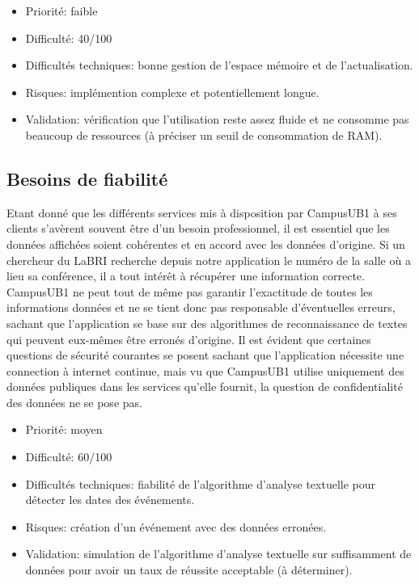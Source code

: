 \documentclass [pdftex,12pt] {report}
\begin{document}
\begin{itemize}
\renewcommand{\labelitemi}{$\bullet$}
\item Priorité: faible
\item Difficulté: 40/100
\item Difficultés techniques: bonne gestion de l'espace mémoire et de l'actualisation.
\item Risques: implémention complexe et potentiellement longue.
\item Validation: vérification que l'utilisation reste assez fluide et ne consomme pas beaucoup de ressources (à préciser un seuil de consommation de RAM).
\end{itemize}  

\subsection{Besoins de fiabilité}
Etant donné que les différents services mis à disposition par CampusUB1 à ses clients s'avèrent souvent être d'un besoin professionnel, il est essentiel que les données affichées soient cohérentes et en accord avec les données d'origine. Si un chercheur du LaBRI recherche depuis notre application le numéro de la salle où a lieu sa conférence, il a tout intérêt à récupérer une information correcte. CampusUB1 ne peut tout de même pas garantir l'exactitude de toutes les informations données et ne se tient donc pas responsable d'éventuelles erreurs, sachant que l'application se base sur des algorithmes de reconnaissance de textes qui peuvent eux-mêmes être erronés d'origine. Il est évident que certaines questions de sécurité courantes se posent sachant que l'application nécessite une connection à internet continue, mais vu que CampusUB1 utilise uniquement des données publiques dans les services qu'elle fournit, la question de confidentialité des données ne se pose pas. \\

\begin{itemize}
\renewcommand{\labelitemi}{$\bullet$}
\item Priorité: moyen
\item Difficulté: 60/100
\item Difficultés techniques: fiabilité de l'algorithme d'analyse textuelle pour détecter les dates des événements.
\item Risques: création d'un événement avec des données erronées.
\item Validation: simulation de l'algorithme d'analyse textuelle sur suffisamment de données pour avoir un taux de réussite acceptable (à déterminer).
\end{itemize}  
\end{document}
